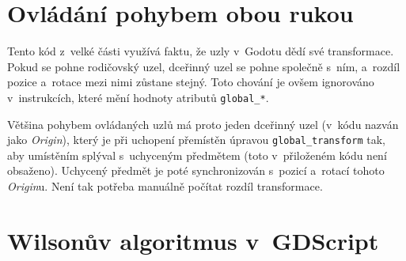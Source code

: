 \documentclass[12pt]{report}
\begin{document}
\chapter{Ovládání pohybem obou rukou}\label{apx_gripped_object_transformation}
Tento kód z~velké části využívá faktu, že uzly v~Godotu dědí své transformace. Pokud se pohne rodičovský uzel, dceřinný uzel se pohne společně s~ním, a~rozdíl pozice a~rotace mezi nimi zůstane stejný. Toto chování je ovšem ignorováno v~instrukcích, které mění hodnoty atributů \texttt{global\_*}.

Většina pohybem ovládaných uzlů má proto jeden dceřinný uzel (v~kódu nazván jako \textit{Origin}), který je při uchopení přemístěn úpravou \texttt{global\_transform} tak, aby umístěním splýval s~uchyceným předmětem (toto v~přiloženém kódu není obsaženo). Uchycený předmět je poté synchronizován s~pozicí a~rotací tohoto \textit{Origin}u. Není tak potřeba manuálně počítat rozdíl transformace.



\chapter{Wilsonův algoritmus v~GDScript}\label{apx_mazegen}

\end{document}

